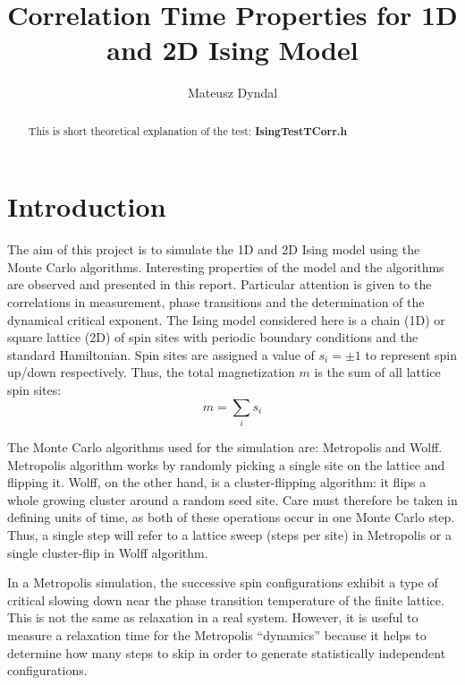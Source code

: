 \documentclass[11pt,a4paper]{article}%
\begin{document}
\title{Correlation Time Properties for 1D and 2D Ising Model}
\author{Mateusz Dyndal}
\maketitle

\begin{abstract}
This is short theoretical explanation of the test:
\textbf{IsingTestTCorr.h}
\end{abstract}


\section{Introduction}
The aim of this project is to simulate the 1D and 2D Ising model using the Monte Carlo algorithms. Interesting properties of the model and the algorithms are observed and presented in this report. Particular attention is given to the correlations in measurement, phase transitions and the determination of the dynamical critical
exponent. 
The Ising model considered here is a chain (1D) or square lattice (2D) of spin sites with periodic boundary conditions and the standard Hamiltonian. Spin sites are assigned a value of $s_{i}=\pm1$ to represent spin up/down respectively. Thus, the total magnetization $m$ is the sum of all lattice spin sites:
\begin{equation}
m=\sum_{i}s_{i}
\end{equation}

The Monte Carlo algorithms used for the simulation are: Metropolis and Wolff. 
Metropolis algorithm works by randomly picking a single site on the lattice and flipping it. Wolff, on the other hand, is a cluster-flipping algorithm: it flips a whole growing cluster around a random seed site. 
Care must therefore be taken in defining units of time, as both of these operations occur in one Monte Carlo step. Thus, a single step will refer to a lattice sweep (steps per site) in Metropolis or a single cluster-flip in Wolff algorithm.

In a Metropolis simulation, the successive spin configurations exhibit
a type of critical slowing down near the phase transition temperature
of the finite lattice. This is not the same as relaxation in a real
system. However, it is useful to measure a relaxation time for the
Metropolis “dynamics” because it helps to determine how many steps to
skip in order to generate statistically independent configurations.
\end{document}
